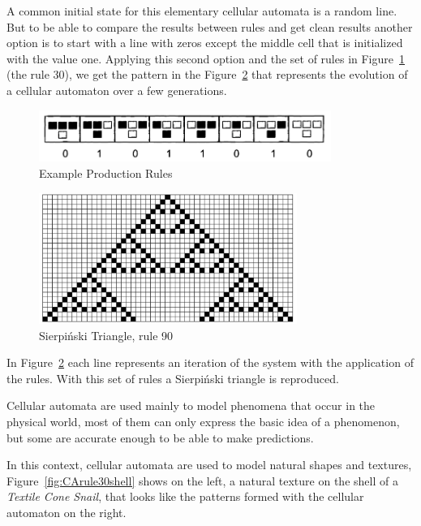 A common initial state for this elementary cellular automata is a random line. But to be able to compare the results between rules and get clean results another option is to start with a line with zeros except the middle cell that is initialized with the value one. Applying this second option and the set of rules in Figure~\ref{fig:CArule} (the rule 30), we get the pattern in the Figure~\ref{fig:resultCA} that represents the evolution of a cellular automaton over a few generations.

\begin{figure}[htbp]
	\centering
	\includegraphics[width=0.85\textwidth]{images/Theory/Cellular_A/Rules.png}
	\caption{Example Production Rules\cite{Shiffman2012}}
	\label{fig:CArule}
\end{figure}



\begin{figure}[h!]
    \centering
    \includegraphics[width=0.75\textwidth]{images/Theory/Cellular_A/Result.png}
    \caption{Sierpiński Triangle, rule 90}
    \label{fig:resultCA}
\end{figure}


In Figure~\ref{fig:resultCA} each line represents an iteration of the system with the application of the rules. With this set of rules a Sierpiński triangle is reproduced.


Cellular automata are used mainly to model phenomena that occur in the physical world, most of them can only express the basic idea of a phenomenon, but some are accurate enough to be able to make predictions.

In this context, cellular automata are used to model natural shapes and textures, Figure~\ref{fig:CArule30shell} shows on the left, a natural texture on the shell of a \emph{Textile Cone Snail}, that looks like the patterns formed with the cellular automaton on the right.




